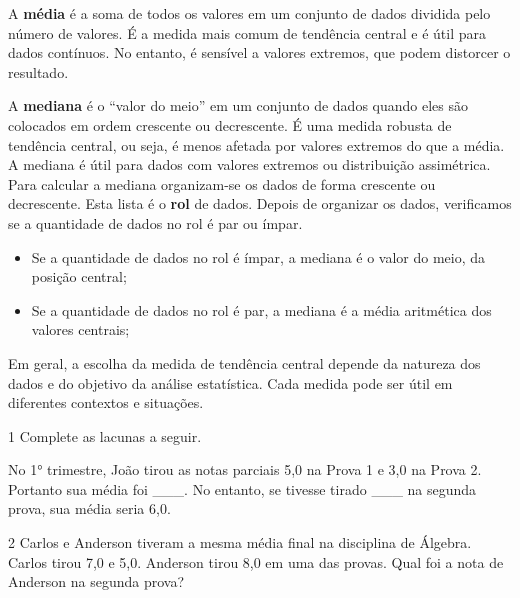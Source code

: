 {{{\begin{escolha}
{{{{\begin{escolha}
\begin{escolha}
{{A \textbf{média} é a soma de todos os valores em um conjunto de dados dividida
pelo número de valores. É a medida mais comum de tendência central e é
útil para dados contínuos. No entanto, é sensível a valores extremos,
que podem distorcer o resultado.

A \textbf{mediana} é o ``valor do meio'' em um conjunto de dados quando eles são
colocados em ordem crescente ou decrescente. É uma medida robusta de
tendência central, ou seja, é menos afetada por valores extremos do que
a média. A mediana é útil para dados com valores extremos ou
distribuição assimétrica. Para calcular a mediana organizam-se os dados
de forma crescente ou decrescente. Esta lista é o \textbf{rol} de dados. 
Depois de organizar os dados, verificamos se a quantidade de dados no rol
é par ou ímpar.

\begin{itemize}
\item
  Se a quantidade de dados no rol é ímpar, a mediana é o valor do meio,
  da posição central;
\item
  Se a quantidade de dados no rol é par, a mediana é a média aritmética
  dos valores centrais;
\end{itemize}

Em geral, a escolha da medida de tendência central depende da natureza
dos dados e do objetivo da análise estatística. Cada medida pode ser
útil em diferentes contextos e situações.
}


\num{1} Complete as lacunas a seguir.

No 1° trimestre, João tirou as notas parciais 5,0 na Prova 1 e 3,0 na
Prova 2. Portanto sua média foi \_\_\_. No entanto, se tivesse tirado
\_\_\_ na segunda prova, sua média seria 6,0.



\num{2} Carlos e Anderson tiveram a mesma média final na disciplina de Álgebra.
Carlos tirou 7,0 e 5,0. Anderson tirou 8,0 em uma das provas. Qual foi a nota 
de Anderson na segunda prova?




}
\end{escolha}
\end{escolha}}}}}
\end{escolha}}}}
